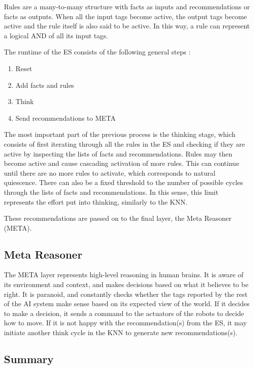 \documentclass[titlepage,11pt]{article}
\begin{document}
Rules are a many-to-many structure with facts as inputs and recommendations or facts as outputs. When all the input tags become active, the output tags become active and the rule itself is also said to be active. In this way, a rule can represent a logical AND of all its input tags.

The runtime of the ES consists of the following general steps \cite{vybihal-expert}:

\begin{enumerate}
	\item Reset
	\item Add facts and rules
	\item Think
	\item Send recommendations to META
\end{enumerate}

The most important part of the previous process is the thinking stage, which consists of first iterating through all the rules in the ES and checking if they are active by inspecting the lists of facts and recommendations. Rules may then become active and cause cascading activation of more rules. This can continue until there are no more rules to activate, which corresponds to natural quiescence. There can also be a fixed threshold to the number of possible cycles through the lists of facts and recommendations. In this sense, this limit represents the effort put into thinking, similarly to the KNN.

These recommendations are passed on to the final layer, the Meta Reasoner (META).

\subsection{Meta Reasoner}

The META layer represents high-level reasoning in human brains. It is aware of its environment and context, and makes decisions based on what it believes to be right. It is paranoid, and constantly checks whether the tags reported by the rest of the AI system make sense based on its expected view of the world. If it decides to make a decision, it sends a command to the actuators of the robots to decide how to move. If it is not happy with the recommendation(s) from the ES, it may initiate another think cycle in the KNN to generate new recommendations(s).

\subsection{Summary}
\end{document}
